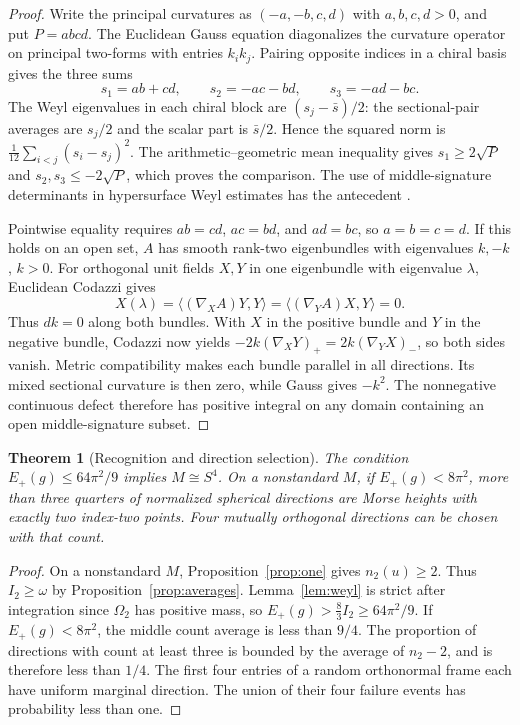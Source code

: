 \documentclass[11pt,letterpaper]{article}
\numberwithin{equation}{section}
\newtheorem{theorem}{Theorem}[section]
\begin{document}
\begin{proof}
Write the principal curvatures as \((-a,-b,c,d)\) with
\(a,b,c,d>0\), and put \(P=abcd\).
The Euclidean Gauss equation diagonalizes the curvature operator
on principal two-forms with entries \(k_i k_j\). Pairing opposite
indices in a chiral basis gives the three sums
\[
 s_1=ab+cd,\qquad s_2=-ac-bd,\qquad s_3=-ad-bc.
\]
The Weyl eigenvalues in each chiral block are \((s_j-\bar s)/2\):
the sectional-pair averages are \(s_j/2\) and the scalar part is
\(\bar s/2\). Hence the squared norm is
\(\frac1{12}\sum_{i<j}(s_i-s_j)^2\). The arithmetic--geometric mean
inequality gives \(s_1\ge2\sqrt P\) and \(s_2,s_3\le-2\sqrt P\),
which proves the comparison. The use of middle-signature
determinants in hypersurface Weyl estimates has the antecedent
\cite[\S\S2--3]{OntiVlachos2017Hypersurfaces}.

Pointwise equality requires \(ab=cd\), \(ac=bd\), and \(ad=bc\),
so \(a=b=c=d\). If this holds on an open set, \(A\) has smooth
rank-two eigenbundles with eigenvalues \(k,-k\), \(k>0\).
For orthogonal unit fields \(X,Y\) in one eigenbundle with
eigenvalue \(\lambda\), Euclidean Codazzi gives
\[
 X(\lambda)=\langle(\nabla_X A)Y,Y\rangle
            =\langle(\nabla_Y A)X,Y\rangle=0 .
\]
Thus \(dk=0\) along both bundles. With \(X\) in the positive
bundle and \(Y\) in the negative bundle, Codazzi now yields
\(-2k(\nabla_XY)_+=2k(\nabla_YX)_-\), so both sides vanish.
Metric compatibility makes each bundle parallel in all directions.
Its mixed sectional curvature is then zero, while Gauss gives
\(-k^2\). The nonnegative continuous defect therefore has positive
integral on any domain containing an open middle-signature subset.
\end{proof}

\begin{theorem}[Recognition and direction selection]\label{thm:band}
The condition \(E_+(g)\le64\pi^2/9\) implies \(M\cong S^4\).
On a nonstandard \(M\), if \(E_+(g)<8\pi^2\), more than three
quarters of normalized spherical directions are Morse heights
with exactly two index-two points. Four mutually orthogonal
directions can be chosen with that count.
\end{theorem}

\begin{proof}
On a nonstandard \(M\), Proposition~\ref{prop:one} gives
\(n_2(u)\ge2\). Thus \(I_2\ge\omega\) by
Proposition~\ref{prop:averages}. Lemma~\ref{lem:weyl} is strict
after integration since \(\Omega_2\) has positive mass, so
\(E_+(g)>\frac83 I_2\ge64\pi^2/9\).
If \(E_+(g)<8\pi^2\), the middle count average is less than \(9/4\).
The proportion of directions with count at least three is bounded
by the average of \(n_2-2\), and is therefore less than \(1/4\).
The first four entries of a random orthonormal frame each have
uniform marginal direction. The union of their four failure events
has probability less than one.
\end{proof}
\end{document}
